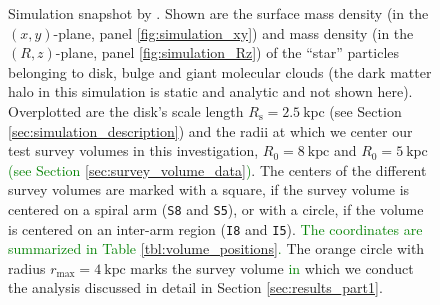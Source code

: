 \documentclass[iop,revtex4,numberedappendix,appendixfloats]{emulateapj}
\newcommand{\NEW}[1]{\textcolor{Green}{#1}}
\newcommand{\OLD}[1]{}
\begin{document}
\begin{figure}[!htbp]
\caption{Simulation snapshot by \citet{2013ApJ...766...34D}. Shown are the surface mass density (in the $(x,y)$-plane, panel \ref{fig:simulation_xy}) and mass density (in the $(R,z)$-plane, panel \ref{fig:simulation_Rz}) of the ``star'' particles belonging to disk, bulge and giant molecular clouds (the dark matter halo in this simulation is static and analytic and not shown here). Overplotted are the disk's scale length $R_\text{s}=2.5~\text{kpc}$ (see Section \ref{sec:simulation_description}) and the radii at which we center our test survey volumes in this investigation, $R_0=8~\text{kpc}$ and $R_0 = 5~\text{kpc}$ \NEW{(see Section \ref{sec:survey_volume_data})}. The centers of the different survey volumes are marked with a square, if the survey volume is centered on a spiral arm (\texttt{S8} and \texttt{\texttt{S5}}), or with a circle, if the volume is centered on an inter-arm region (\texttt{I8} and \texttt{\texttt{I5}}). \NEW{The coordinates are summarized in Table \ref{tbl:volume_positions}.} The orange circle with radius $r_\text{max}=4~\text{kpc}$ marks the survey volume \OLD{in}\NEW{in} which we conduct the analysis discussed in detail in Section \ref{sec:results_part1}.}

\end{figure}
\end{document}
